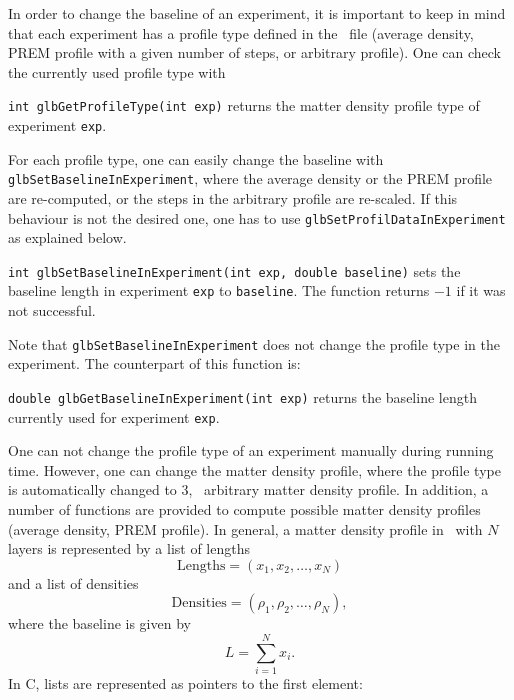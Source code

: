 In order to change the baseline of an experiment, it is important
to keep in mind that each experiment has a profile type defined
in the \AEDL\ file (average density, PREM profile with a given
number of steps, or arbitrary profile). One can check the currently
used profile type with
\begin{function}
{\tt int glbGetProfileType(int exp)} returns the matter density profile
type of experiment {\tt exp}.
\end{function}
For each profile type, one can easily change the baseline with {\tt glbSetBaselineInExperiment},
where the average density or the PREM profile are re-computed, or the
steps in the arbitrary profile are re-scaled. If this behaviour is 
not the desired one, one has to use {\tt glbSetProfilDataInExperiment}
as explained below.
\begin{function}
{\tt int glbSetBaselineInExperiment(int exp, double baseline)}
sets the baseline length in experiment {\tt exp} to {\tt baseline}.
The function returns $-1$ if it was not successful.
\end{function}
Note that {\tt glbSetBaselineInExperiment} does not change the
profile type in the experiment. The counterpart of this function is:
\begin{function}
{\tt double glbGetBaselineInExperiment(int exp)} returns the
baseline length currently used for experiment {\tt exp}.
\end{function}
One can not change the profile type of an experiment manually
during running time. However, one can change the matter density
profile, where the profile type is automatically changed to 3, \ie\ 
arbitrary matter density profile. In addition, a number of functions 
are provided to compute possible matter density profiles (average density,
PREM profile). In general, a matter density profile in \GLOBES\ with
$N$ layers is represented by a list of lengths 
\begin{equation}
\mathrm{Lengths} = (x_1,x_2, \hdots, x_N) 
\end{equation}
and a list of densities
\begin{equation}
\mathrm{Densities} = (\rho_1,\rho_2, \hdots, \rho_N), 
\end{equation}
where the baseline is given by
\begin{equation}
L = \sum\limits_{i=1}^N x_i.
\end{equation}
In C, lists are represented as pointers to the first element:
